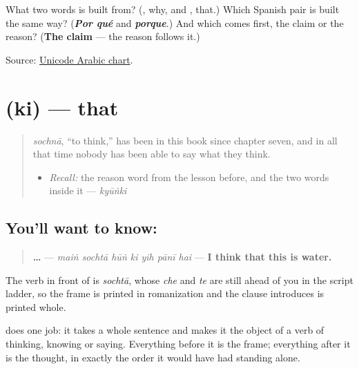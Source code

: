 \begin{tcolorbox}[breakable,colback=teal!4,colframe=teal!35!black,title={Before you move on}]
What two words is \textbf{} built from? (\textbf{}, why, and \textbf{}, that.) Which Spanish pair is built the same way? (\emph{\textbf{Por qué}} and \emph{\textbf{porque}}.) And which comes first, the claim or the reason? (\textbf{The claim} — the reason follows it.)

Source: \href{https://www.unicode.org/charts/PDF/U0600.pdf}{Unicode Arabic chart}.
\end{tcolorbox}
\section[\texorpdfstring{\ur{کہ} (ki)}{کہ (ki)}]{ (ki) — that}

\label{lesson:UR-C21-ki}



\begin{quote}
\emph{sochnā}, \textquotedblleft{}to think,\textquotedblright{} has been in this book since chapter seven, and in all that time nobody has been able to say what they think.

\begin{itemize}
\raggedright
  \item \emph{Recall:} the reason word from the lesson before, and the two words inside it — \emph{kyūṅki}
\end{itemize}
\end{quote}

\subsection*{You'll want to know: }
\begin{quote}
\textbf{…    } — \emph{maiṅ sochtā hūṅ ki yih pānī hai} — \textbf{I think that this is water.}
\end{quote}

The verb in front of \textbf{} is \emph{sochtā}, whose \emph{che} and \emph{te} are still ahead of you in the script ladder, so the frame is printed in romanization and the clause \textbf{} introduces is printed whole.

\textbf{} does one job: it takes a whole sentence and makes it the object of a verb of thinking, knowing or saying. Everything before it is the frame; everything after it is the thought, in exactly the order it would have had standing alone.

